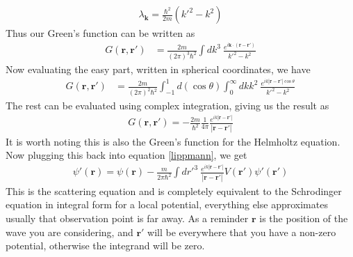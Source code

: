 \begin{align}
\lambda_\textbf{k} = \frac{\hbar^2}{2m}(k'^2-k^2)
\end{align}
Thus our Green's function can be written as
\begin{align}
G(\textbf{r},\textbf{r}') &= \frac{2m}{(2\pi)^3\hbar^2}\int dk^3 ~\frac{e^{i\textbf{k}\cdot(\textbf{r}-\textbf{r}')}}{k'^2-k^2}
\end{align}
Now evaluating the easy part, written in spherical coordinates, we have
\begin{align}
G(\textbf{r},\textbf{r}') &= \frac{2m}{(2\pi)^2\hbar^2}\int_{-1}^1 d(\cos\theta) \int_0^\infty dk k^2 ~\frac{e^{ik|\textbf{r}-\textbf{r}'|\cos\theta}}{k'^2-k^2}
\end{align}
The rest can be evaluated using complex integration, giving us the result as
\begin{align}
G(\textbf{r},\textbf{r}') = -\frac{2m}{\hbar^2}\frac{1}{4\pi} \frac{e^{ik|\textbf{r}-\textbf{r}'|}}{|\textbf{r}-\textbf{r}'|}
\end{align}
It is worth noting this is also the Green's function for the Helmholtz equation. Now plugging this back into equation \ref{lippmann}, we get
\begin{align}\label{scat}
\boxed{\psi'(\textbf{r}) = \psi(\textbf{r})  -\frac{m}{2\pi\hbar^2}\int dr'^3~ \frac{e^{ik|\textbf{r}-\textbf{r}'|}}{|\textbf{r}-\textbf{r}'|} V(\textbf{r}')\psi'(\textbf{r}')}
\end{align}
This is the scattering equation and is completely equivalent to the Schrodinger equation in integral form for a local potential\cite{griffiths_qm}, everything else approximates usually that observation point is far away. As a reminder $\textbf{r}$ is the position of the wave you are considering, and $\textbf{r}'$ will be everywhere that you have a non-zero potential, otherwise the integrand will be zero.

